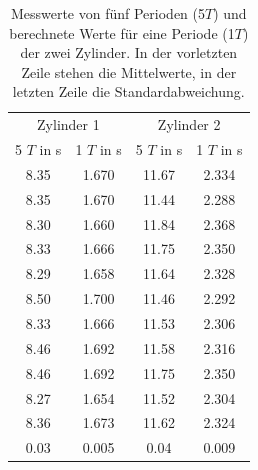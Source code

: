\begin{table}
  \centering
  \begin{tabular}{c c c c}
    \toprule
    \multicolumn{2}{c}{Zylinder 1} & \multicolumn{2}{c}{Zylinder 2}\\
    5 $T$ in \si{\second} & 1 $T$ in \si{\second} & 5 $T$ in \si{\second} &
    1 $T$ in \si{\second} \\
    \midrule
    8.35 & 1.670 & 11.67 & 2.334 \\
    8.35 & 1.670 & 11.44 & 2.288 \\
    8.30 & 1.660 & 11.84 & 2.368 \\
    8.33 & 1.666 & 11.75 & 2.350 \\
    8.29 & 1.658 & 11.64 & 2.328 \\
    8.50 & 1.700 & 11.46 & 2.292 \\
    8.33 & 1.666 & 11.53 & 2.306 \\
    8.46 & 1.692 & 11.58 & 2.316 \\
    8.46 & 1.692 & 11.75 & 2.350 \\
    8.27 & 1.654 & 11.52 & 2.304 \\
    \midrule
    8.36 & 1.673 & 11.62 & 2.324 \\
    0.03 & 0.005 &  0.04 & 0.009 \\
    \bottomrule
  \end{tabular}
  \caption{Messwerte von fünf Perioden (5$T$) und berechnete Werte für eine Periode
  (1$T$) der zwei Zylinder. In der vorletzten Zeile stehen die Mittelwerte, in
  der letzten Zeile die Standardabweichung.}
  \label{tab:messwerte_zylinder}
\end{table}

